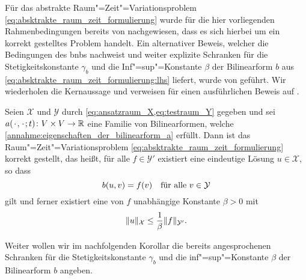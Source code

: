 Für das abstrakte Raum"=Zeit"=Variationsproblem \cref{eq:absktrakte_raum_zeit_formulierung} wurde für die hier vorliegenden Rahmenbedingungen bereits von \textcite[Section XVIII.3]{Dautray:1992by} nachgewiesen, dass es sich hierbei um ein korrekt gestelltes Problem handelt.
Ein alternativer Beweis, welcher die Bedingungen des \acl{bnb}s nachweist und weiter explizite Schranken für die Stetigkeitskonstante $\gamma_{b}$ und die Inf"=sup"=Konstante $\beta$ der Bilinearform $b$ aus \cref{eq:absktrakte_raum_zeit_formulierung:lhs} liefert, wurde von \textcite{Schwab:2009ec} geführt.
Wir wiederholen die Kernaussage \cite[Theorem 5.1]{Schwab:2009ec} und verweisen für einen ausführlichen Beweis auf \cite[Appendix A]{Schwab:2009ec}.

\begin{Satz}
\label{satz:ss09:theorem51}
    Seien $\mathcal X$ und $\mathcal Y$ durch \cref{eq:ansatzraum_X,eq:testraum_Y} gegeben und sei $a(\blank, \blank; t) \colon V \times V \to \mathbb{R}$ eine Familie von Bilinearformen, welche \cref{annahme:eigenschaften_der_bilinearform_a} erfüllt.
    Dann ist das Raum"=Zeit"=Variationsproblem \cref{eq:absktrakte_raum_zeit_formulierung} korrekt gestellt, das heißt, für alle $f \in \mathcal Y'$ existiert eine eindeutige Lösung $u \in \mathcal X$, so dass
    \begin{equation}
        b(u, v) = f(v) \quad \fa v \in \mathcal Y
    \end{equation}
    gilt und ferner existiert eine von $f$ unabhängige Konstante $\beta > 0$ mit
    \begin{equation}
        \norm{u}_{\mathcal X} \leq \frac{1}{\beta} \norm{f}_{\mathcal Y'}.
    \end{equation}
\end{Satz}

Weiter wollen wir im nachfolgenden Korollar die bereits angesprochenen Schranken für die Stetigkeitskonstante $\gamma_{b}$ und die inf"=sup"=Konstante $\beta$ der Bilinearform $b$ angeben.

